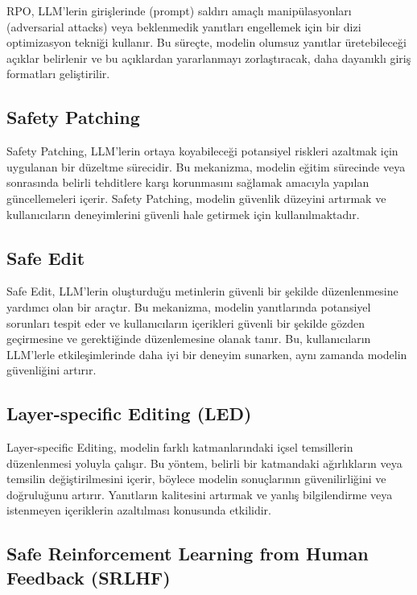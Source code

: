 RPO, LLM'lerin girişlerinde (prompt) saldırı amaçlı manipülasyonları (adversarial attacks) veya beklenmedik yanıtları engellemek için bir dizi optimizasyon tekniği kullanır. Bu süreçte, modelin olumsuz yanıtlar üretebileceği açıklar belirlenir ve bu açıklardan yararlanmayı zorlaştıracak, daha dayanıklı giriş formatları geliştirilir.

\newpage

\subsection{Safety Patching}

Safety Patching, LLM'lerin ortaya koyabileceği potansiyel riskleri azaltmak için uygulanan bir düzeltme sürecidir. Bu mekanizma, modelin eğitim sürecinde veya sonrasında belirli tehditlere karşı korunmasını sağlamak amacıyla yapılan güncellemeleri içerir. Safety Patching, modelin güvenlik düzeyini artırmak ve kullanıcıların deneyimlerini güvenli hale getirmek için kullanılmaktadır.

\newpage

\subsection{Safe Edit}

Safe Edit, LLM'lerin oluşturduğu metinlerin güvenli bir şekilde düzenlenmesine yardımcı olan bir araçtır. Bu mekanizma, modelin yanıtlarında potansiyel sorunları tespit eder ve kullanıcıların içerikleri güvenli bir şekilde gözden geçirmesine ve gerektiğinde düzenlemesine olanak tanır. Bu, kullanıcıların LLM'lerle etkileşimlerinde daha iyi bir deneyim sunarken, aynı zamanda modelin güvenliğini artırır.

\newpage

\subsection{Layer-specific Editing (LED)}

Layer-specific Editing, modelin farklı katmanlarındaki içsel temsillerin düzenlenmesi yoluyla çalışır. Bu yöntem, belirli bir katmandaki ağırlıkların veya temsilin değiştirilmesini içerir, böylece modelin sonuçlarının güvenilirliğini ve doğruluğunu artırır. Yanıtların kalitesini artırmak ve yanlış bilgilendirme veya istenmeyen içeriklerin azaltılması konusunda etkilidir.

\newpage

\subsection{Safe Reinforcement Learning from Human Feedback (SRLHF)}


